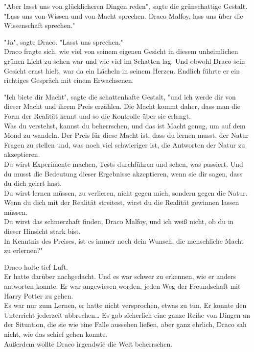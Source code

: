 {"Aber lasst uns von glücklicheren Dingen reden", sagte die grünschattige Gestalt. "Lass uns von Wissen und von Macht sprechen. Draco Malfoy, lass uns über die Wissenschaft sprechen."

"Ja", sagte Draco. "Lasst uns sprechen."\\ Draco fragte sich, wie viel von seinem eigenen Gesicht in diesem unheimlichen grünen Licht zu sehen war und wie viel im Schatten lag. Und obwohl Draco sein Gesicht ernst hielt, war da ein Lächeln in seinem Herzen. Endlich führte er ein richtiges Gespräch mit einem Erwachsenen.

"Ich biete dir Macht", sagte die schattenhafte Gestalt, "und ich werde dir von dieser Macht und ihrem Preis erzählen. Die Macht kommt daher, dass man die Form der Realität kennt und so die Kontrolle über sie erlangt.\\ Was du verstehst, kannst du beherrschen, und das ist Macht genug, um auf dem Mond zu wandeln. Der Preis für diese Macht ist, dass du lernen musst, der Natur Fragen zu stellen und, was noch viel schwieriger ist, die Antworten der Natur zu akzeptieren.\\ Du wirst Experimente machen, Tests durchführen und sehen, was passiert. Und du musst die Bedeutung dieser Ergebnisse akzeptieren, wenn sie dir sagen, dass du dich geirrt hast.\\ Du wirst lernen müssen, zu verlieren, nicht gegen mich, sondern gegen die Natur.\\ Wenn du dich mit der Realität streitest, wirst du die Realität gewinnen lassen müssen.\\ Du wirst das schmerzhaft finden, Draco Malfoy, und ich weiß nicht, ob du in dieser Hinsicht stark bist.\\ In Kenntnis des Preises, ist es immer noch dein Wunsch, die menschliche Macht zu erlernen?"

Draco holte tief Luft.\\ Er hatte darüber nachgedacht. Und es war schwer zu erkennen, wie er anders antworten konnte. Er war angewiesen worden, jeden Weg der Freundschaft mit Harry Potter zu gehen.\\ Es war nur zum Lernen, er hatte nicht versprochen, etwas zu tun. Er konnte den Unterricht jederzeit abbrechen… Es gab sicherlich eine ganze Reihe von Dingen an der Situation, die sie wie eine Falle aussehen ließen, aber ganz ehrlich, Draco sah nicht, wie das schief gehen konnte.\\ Außerdem wollte Draco irgendwie die Welt beherrschen.

}
